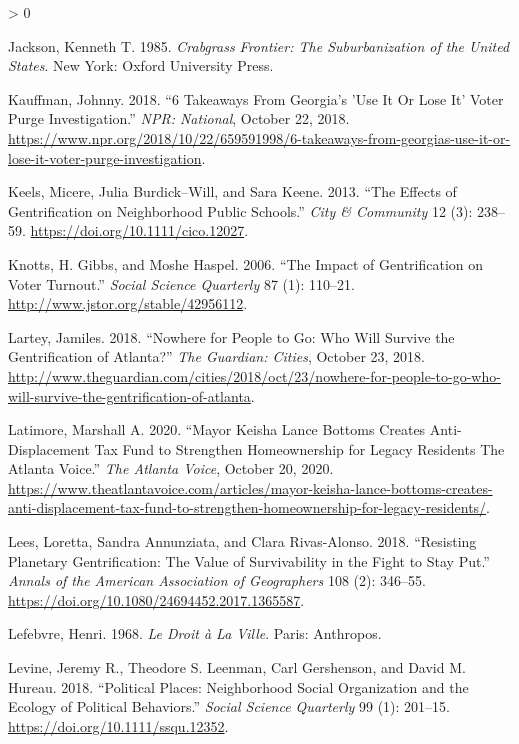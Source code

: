 \documentclass[
  12pt,
]{article}
\newlength{\cslhangindent}
\newenvironment{CSLReferences}[2] %
 {%
  \setlength{\parindent}{0pt}
  \ifodd #1 \everypar{\setlength{\hangindent}{\cslhangindent}}\ignorespaces\fi
  \ifnum #2 > 0
  \setlength{\parskip}{#2\baselineskip}
  \fi
 }%
 {}
\begin{document}
\begin{CSLReferences}{1}{0}
\leavevmode\hypertarget{ref-Jackson1985}{}%
Jackson, Kenneth T. 1985. \emph{Crabgrass Frontier: The Suburbanization of the {United States}}. {New York}: {Oxford University Press}.

\leavevmode\hypertarget{ref-Kauffman2018}{}%
Kauffman, Johnny. 2018. {``6 {Takeaways From Georgia}'s '{Use It Or Lose It}' {Voter Purge Investigation}.''} \emph{NPR: National}, October 22, 2018. \url{https://www.npr.org/2018/10/22/659591998/6-takeaways-from-georgias-use-it-or-lose-it-voter-purge-investigation}.

\leavevmode\hypertarget{ref-Keels2013}{}%
Keels, Micere, Julia Burdick--Will, and Sara Keene. 2013. {``The {Effects} of {Gentrification} on {Neighborhood Public Schools}.''} \emph{City \& Community} 12 (3): 238--59. \url{https://doi.org/10.1111/cico.12027}.

\leavevmode\hypertarget{ref-Knotts2006}{}%
Knotts, H. Gibbs, and Moshe Haspel. 2006. {``The {Impact} of {Gentrification} on {Voter Turnout}.''} \emph{Social Science Quarterly} 87 (1): 110--21. \url{http://www.jstor.org/stable/42956112}.

\leavevmode\hypertarget{ref-Lartey2018}{}%
Lartey, Jamiles. 2018. {``Nowhere for People to Go: Who Will Survive the Gentrification of {Atlanta}?''} \emph{The Guardian: Cities}, October 23, 2018. \url{http://www.theguardian.com/cities/2018/oct/23/nowhere-for-people-to-go-who-will-survive-the-gentrification-of-atlanta}.

\leavevmode\hypertarget{ref-Latimore2020}{}%
Latimore, Marshall A. 2020. {``Mayor {Keisha Lance Bottoms} Creates Anti-Displacement Tax Fund to Strengthen Homeownership for Legacy Residents \textbar{} {The Atlanta Voice}.''} \emph{The Atlanta Voice}, October 20, 2020. \url{https://www.theatlantavoice.com/articles/mayor-keisha-lance-bottoms-creates-anti-displacement-tax-fund-to-strengthen-homeownership-for-legacy-residents/}.

\leavevmode\hypertarget{ref-Lees2018}{}%
Lees, Loretta, Sandra Annunziata, and Clara Rivas-Alonso. 2018. {``Resisting {Planetary Gentrification}: {The Value} of {Survivability} in the {Fight} to {Stay Put}.''} \emph{Annals of the American Association of Geographers} 108 (2): 346--55. \url{https://doi.org/10.1080/24694452.2017.1365587}.

\leavevmode\hypertarget{ref-Lefebvre1968}{}%
Lefebvre, Henri. 1968. \emph{Le {Droit} à La {Ville}}. {Paris}: {Anthropos}.

\leavevmode\hypertarget{ref-Levine2018}{}%
Levine, Jeremy R., Theodore S. Leenman, Carl Gershenson, and David M. Hureau. 2018. {``Political {Places}: {Neighborhood Social Organization} and the {Ecology} of {Political Behaviors}.''} \emph{Social Science Quarterly} 99 (1): 201--15. \url{https://doi.org/10.1111/ssqu.12352}.


\end{CSLReferences}
\end{document}
